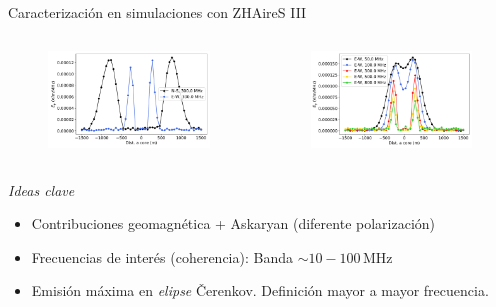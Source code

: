\documentclass{beamer}
\begin{document}
\begin{frame}{Caracterización en simulaciones con ZHAireS III}
	\begin{columns}
	\begin{figure}[H]
		\centering
		\includegraphics[width=.95\linewidth]{figures/radio/downgoing_p_10EeV_70deg_Ey_300MHz_ground_v2}
	\end{figure}
\begin{figure}[H]
	\centering
	\includegraphics[width=.95\linewidth]{figures/radio/downgoing_p_10EeV_70deg_Ey_varfreq_groundEW_v2}
\end{figure}
	\end{columns}
\pause\begin{block}{\centering\textit{Ideas clave}}
	\begin{itemize}
		\item Contribuciones geomagnética + Askaryan (diferente polarización)
		\item Frecuencias de interés (coherencia): Banda $\sim 10-100\,\mathrm{MHz}$
		\item Emisión máxima en \textit{elipse} \v{C}erenkov. Definición mayor a mayor frecuencia.
	\end{itemize}
\end{block}
\end{frame}
\end{document}
